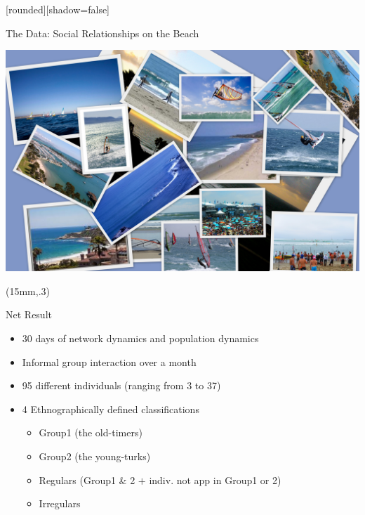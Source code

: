 \documentclass[10pt]{beamer}
\begin{document}
{
[rounded][shadow=false]

\begin{frame}{The Data: Social Relationships on the Beach}

\begin{center}
\includegraphics[width=1\linewidth]{graphics/windsurfingPhotos.jpg}
\end{center}

\begin{textblock*}{90mm}(15mm,.3\textheight)
\begin{block}{Net Result}
\begin{itemize}
\item<1> 30 days of network dynamics and population dynamics
\item<2>  Informal group interaction over a month
\item<3> 95 different individuals (ranging from 3 to 37)
\item<4>{ 4 Ethnographically defined classifications

\begin{itemize}
\item Group1 (the old-timers)
\item Group2 (the young-turks)
\item Regulars (Group1 \& 2 $+$ indiv. not app in Group1 or 2)
\item Irregulars
\end{itemize}
}
\end{itemize}
\end{block}
\end{textblock*}
\end{frame}
}
\end{document}
